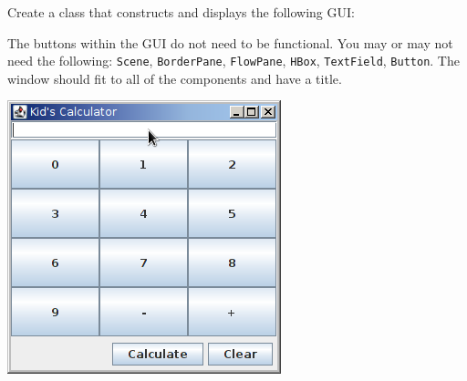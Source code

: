 Create a class that constructs and displays the following GUI: \\
\begin{minipage}{0.5\textwidth}
\vspace{-48pt}
The buttons within the GUI do not need to be functional.  You may or may not need the following: \texttt{Scene}, \texttt{BorderPane}, \texttt{FlowPane}, \texttt{HBox}, \texttt{TextField}, \texttt{Button}. The window should fit to all of the components and have a title.
\end{minipage}
\hspace{50px}
\begin{minipage}{0.3\textwidth}
\includegraphics[scale=0.6]{other/calculator.png}
\end{minipage} \hfill

